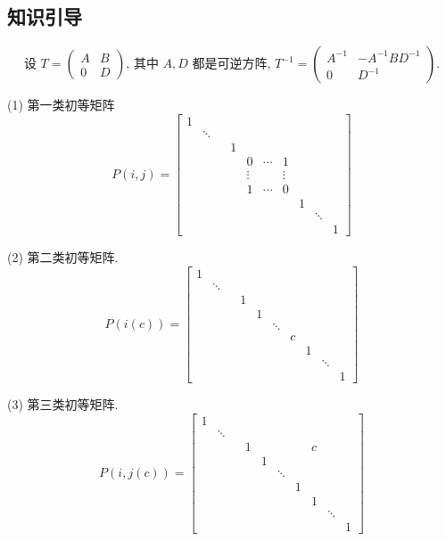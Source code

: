 \subsection{知识引导}

$$
\text { 设 } T=\left(\begin{array}{cc}
    A & B \\
    0 & D
    \end{array}\right) \text {, 其中 } A, D \text { 都是可逆方阵, }  T^{-1}=\left(\begin{array}{cc}
        A^{-1} & -A^{-1} B D^{-1} \\
        0 & D^{-1}
        \end{array}\right)\text {. }
$$

(1) 第一类初等矩阵
$$
P(i,j)=\begin{bmatrix}
    1 &  &  &  &  &  &  &  & \\
     & \ddots  &  &  &  &  &  &  & \\
     &  &  & 1 &  &  &  &  & \\
     &  &  &  & 0 & \cdots & 1 &  & \\
     &  &  &  & \vdots &  & \vdots &  & \\
     &  &  &  & 1 & \cdots & 0&  & \\
     &  &  &  &  &  &  & 1 & \\
     &  &  &  &  &  &  &  &\ddots \\
     &  &  &  &  &  &  &  & &1
   \end{bmatrix}
$$

(2) 第二类初等矩阵. 
$$
P(i(c))=\begin{bmatrix}
    1 &  &  &  &  &  &  &  & \\
     & \ddots  &  &  &  &  &  &  & \\
     &  &  & 1 &  &  &  &  & \\
     &  &  &  & 1 &  &  &  & \\
     &  &  &  &  & \ddots &  &  & \\
     &  &  &  &  & & c&  & \\
     &  &  &  &  &  &  & 1 & \\
     &  &  &  &  &  &  &  &\ddots \\
     &  &  &  &  &  &  &  & &1
   \end{bmatrix}
$$

(3) 第三类初等矩阵.
$$
P(i,j(c))=\begin{bmatrix}
    1 &  &  &  &  &  &  &  & \\
     & \ddots  &  &  &  &  &  &  & \\
     &  &  & 1 &  &  &  & c & \\
     &  &  &  & 1 &  &  &  & \\
     &  &  &  &  & \ddots &  &  & \\
     &  &  &  &  & & 1&  & \\
     &  &  &  &  &  &  & 1 & \\
     &  &  &  &  &  &  &  &\ddots \\
     &  &  &  &  &  &  &  & &1
   \end{bmatrix}
$$

